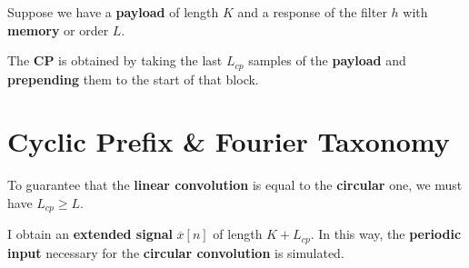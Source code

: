 \documentclass[a4paper, 12pt]{book}
\begin{document}
Suppose we have a \textbf{payload} of length $K$ and a response of the filter $h$ with \textbf{memory} or order $L$.

The \textbf{CP} is obtained by taking the last $L_{cp}$ samples of the \textbf{payload} and \textbf{prepending} them to the start of that block.
\section{Cyclic Prefix \& Fourier Taxonomy}

To guarantee that the \textbf{linear convolution} is equal to the \textbf{circular} one, we must have $L_{cp} \ge L$.

\begin{figure}[h]
    \centering
\end{figure}

I obtain an \textbf{extended signal} $\overline{x}[n]$ of length $K + L_{cp}$.
In this way, the \textbf{periodic input} necessary for the \textbf{circular convolution} is simulated.

\vspace{1em}
\end{document}
